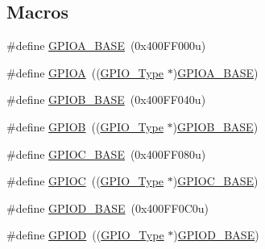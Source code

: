 \subsection*{Macros}
\begin{DoxyCompactItemize}
\item 
\#define \mbox{\hyperlink{group___g_p_i_o___peripheral___access___layer_gad7723846cc5db8e43a44d78cf21f6efa}{G\+P\+I\+O\+A\+\_\+\+B\+A\+SE}}~(0x400\+F\+F000u)
\item 
\#define \mbox{\hyperlink{group___g_p_i_o___peripheral___access___layer_gac485358099728ddae050db37924dd6b7}{G\+P\+I\+OA}}~((\mbox{\hyperlink{struct_g_p_i_o___type}{G\+P\+I\+O\+\_\+\+Type}} $\ast$)\mbox{\hyperlink{group___g_p_i_o___peripheral___access___layer_gad7723846cc5db8e43a44d78cf21f6efa}{G\+P\+I\+O\+A\+\_\+\+B\+A\+SE}})
\item 
\#define \mbox{\hyperlink{group___g_p_i_o___peripheral___access___layer_gac944a89eb789000ece920c0f89cb6a68}{G\+P\+I\+O\+B\+\_\+\+B\+A\+SE}}~(0x400\+F\+F040u)
\item 
\#define \mbox{\hyperlink{group___g_p_i_o___peripheral___access___layer_ga68b66ac73be4c836db878a42e1fea3cd}{G\+P\+I\+OB}}~((\mbox{\hyperlink{struct_g_p_i_o___type}{G\+P\+I\+O\+\_\+\+Type}} $\ast$)\mbox{\hyperlink{group___g_p_i_o___peripheral___access___layer_gac944a89eb789000ece920c0f89cb6a68}{G\+P\+I\+O\+B\+\_\+\+B\+A\+SE}})
\item 
\#define \mbox{\hyperlink{group___g_p_i_o___peripheral___access___layer_ga26f267dc35338eef219544c51f1e6b3f}{G\+P\+I\+O\+C\+\_\+\+B\+A\+SE}}~(0x400\+F\+F080u)
\item 
\#define \mbox{\hyperlink{group___g_p_i_o___peripheral___access___layer_ga2dca03332d620196ba943bc2346eaa08}{G\+P\+I\+OC}}~((\mbox{\hyperlink{struct_g_p_i_o___type}{G\+P\+I\+O\+\_\+\+Type}} $\ast$)\mbox{\hyperlink{group___g_p_i_o___peripheral___access___layer_ga26f267dc35338eef219544c51f1e6b3f}{G\+P\+I\+O\+C\+\_\+\+B\+A\+SE}})
\item 
\#define \mbox{\hyperlink{group___g_p_i_o___peripheral___access___layer_ga1a93ab27129f04064089616910c296ec}{G\+P\+I\+O\+D\+\_\+\+B\+A\+SE}}~(0x400\+F\+F0\+C0u)
\item 
\#define \mbox{\hyperlink{group___g_p_i_o___peripheral___access___layer_ga7580b1a929ea9df59725ba9c18eba6ac}{G\+P\+I\+OD}}~((\mbox{\hyperlink{struct_g_p_i_o___type}{G\+P\+I\+O\+\_\+\+Type}} $\ast$)\mbox{\hyperlink{group___g_p_i_o___peripheral___access___layer_ga1a93ab27129f04064089616910c296ec}{G\+P\+I\+O\+D\+\_\+\+B\+A\+SE}})
\item 

\end{DoxyCompactItemize}

